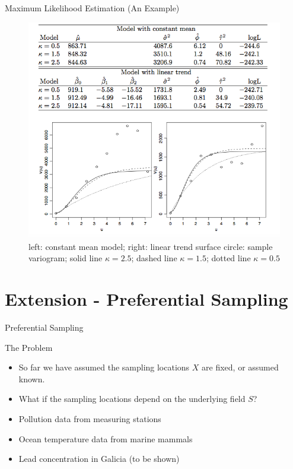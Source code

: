 \documentclass{beamer}
\begin{document}
\begin{frame}{Maximum Likelihood Estimation (An Example)} %
	\begin{figure}
		\centering
		\includegraphics[scale = 0.35]{Images/Pic1}
		\caption{ { \scriptsize left: constant mean model; right: linear trend surface \newline  circle: sample  variogram; solid line $\kappa = 2.5$; dashed line $\kappa = 1.5$; dotted line $\kappa = 0.5$}}
	\end{figure}
\end{frame}

\section{Extension - Preferential Sampling}

\begin{frame}{Preferential Sampling}
\begin{block}{The Problem}
\begin{itemize}
\item So far we have assumed the sampling locations $X$ are fixed, or assumed known.
\item What if the sampling locations depend on the underlying field $S$?
\end{itemize}
\end{block}

\begin{example}
\begin{itemize}
\item Pollution data from measuring stations
\item Ocean temperature data from marine mammals
\item Lead concentration in Galicia (to be shown)
\end{itemize}
\end{example}
\end{frame}
\end{document}
